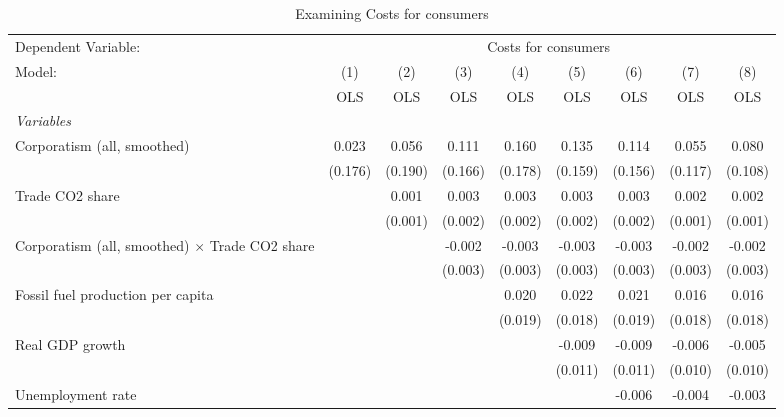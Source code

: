 
\begin{table}[htbp]
   \caption{Examining Costs for consumers}
   \centering
   \begin{tabular}{lcccccccc}
      \toprule
      Dependent Variable: & \multicolumn{8}{c}{Costs for consumers}\\
      Model:                                                & (1)     & (2)     & (3)     & (4)     & (5)     & (6)     & (7)     & (8)\\  
                                                            &  OLS    & OLS     & OLS     & OLS     & OLS     & OLS     & OLS     & OLS\\  
      \midrule
      \emph{Variables}\\
      Corporatism (all, smoothed)                           & 0.023   & 0.056   & 0.111   & 0.160   & 0.135   & 0.114   & 0.055   & 0.080\\   
                                                            & (0.176) & (0.190) & (0.166) & (0.178) & (0.159) & (0.156) & (0.117) & (0.108)\\   
      Trade CO2 share                                       &         & 0.001   & 0.003   & 0.003   & 0.003   & 0.003   & 0.002   & 0.002\\   
                                                            &         & (0.001) & (0.002) & (0.002) & (0.002) & (0.002) & (0.001) & (0.001)\\   
      Corporatism (all, smoothed) $\times$ Trade CO2 share  &         &         & -0.002  & -0.003  & -0.003  & -0.003  & -0.002  & -0.002\\   
                                                            &         &         & (0.003) & (0.003) & (0.003) & (0.003) & (0.003) & (0.003)\\   
      Fossil fuel production per capita                     &         &         &         & 0.020   & 0.022   & 0.021   & 0.016   & 0.016\\   
                                                            &         &         &         & (0.019) & (0.018) & (0.019) & (0.018) & (0.018)\\   
      Real GDP growth                                       &         &         &         &         & -0.009  & -0.009  & -0.006  & -0.005\\   
                                                            &         &         &         &         & (0.011) & (0.011) & (0.010) & (0.010)\\   
      Unemployment rate                                     &         &         &         &         &         & -0.006  & -0.004  & -0.003\\   

\end{tabular}
\end{table}
